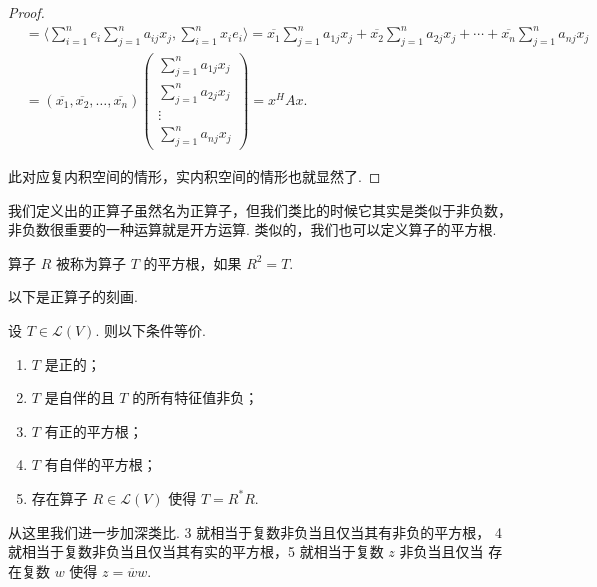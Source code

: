 \begin{proof}
\begin{align*}
        & = \langle \sum_{i = 1}^{n}e_{i}\sum_{j = 1}^{n}a_{ij}x_{j}, \sum_{i = 1}^{n}x_{i}e_{i} \rangle
        = \overline{x_1}\sum_{j = 1}^{n}a_{1j}x_{j} + \overline{x_2}\sum_{j = 1}^{n}a_{2j}x_{j} + \cdots + \overline{x_n}\sum_{j = 1}^{n}a_{nj}x_{j} \\
        & = (\overline{x_1}, \overline{x_2}, \ldots, \overline{x_n})
        \begin{pmatrix}
            \sum_{j = 1}^{n}a_{1j}x_{j} \\
            \sum_{j = 1}^{n}a_{2j}x_{j} \\
            \vdots \\
            \sum_{j = 1}^{n}a_{nj}x_{j}
        \end{pmatrix}
        = x^{H}Ax. 
    \end{align*}

    此对应复内积空间的情形，实内积空间的情形也就显然了. 
\end{proof}

我们定义出的正算子虽然名为正算子，但我们类比的时候它其实是类似于非负数，
非负数很重要的一种运算就是开方运算. 类似的，我们也可以定义算子的平方根.

\begin{definition}
     算子 $ R $ 被称为算子 $ T $ 的平方根，如果 $ R^{2} = T $. 
\end{definition}

以下是正算子的刻画. 

\begin{theorem}
    设 $ T \in \mathcal{L}(V) $. 则以下条件等价. 
    \begin{enumerate}
        \item $ T $ 是正的；
        
        \item $ T $ 是自伴的且 $ T $ 的所有特征值非负；
        
        \item $ T $ 有正的平方根；
        
        \item $ T $ 有自伴的平方根；
        
        \item 存在算子 $ R \in \mathcal{L}(V) $ 使得 $ T = R^{*}R $. 
    \end{enumerate}
\end{theorem}

从这里我们进一步加深类比. 3 就相当于复数非负当且仅当其有非负的平方根，
4 就相当于复数非负当且仅当其有实的平方根，5 就相当于复数 $ z $ 非负当且仅当
存在复数 $ w $ 使得 $ z = \overline{w}w $. 

